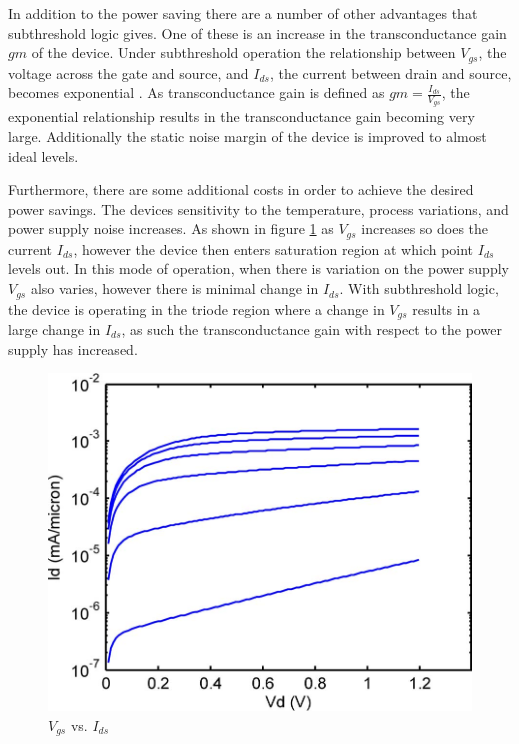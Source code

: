In addition to the power saving there are a number of other advantages that subthreshold logic gives.
One of these is an increase in the transconductance gain $gm$ of the device.
Under subthreshold operation the relationship between $V_{gs}$, the voltage across the gate and source, and $I_{ds}$, the current between drain and source, becomes exponential \cite{ULPSubThresh}.
As transconductance gain is defined as $gm = \frac{I_{ds}}{V_{gs}}$, the exponential relationship results in the transconductance gain becoming very large.
Additionally the static noise margin of the device is improved to almost ideal levels.

Furthermore, there are some additional costs in order to achieve the desired power savings.
The devices sensitivity to the temperature, process variations, and power supply noise increases.
As shown in figure \ref{fig:VgsIds} as $V_{gs}$ increases so does the current $I_{ds}$, however the device then enters saturation region at which point $I_{ds}$ levels out.
In this mode of operation, when there is variation on the power supply $V_{gs}$ also varies, however there is minimal change in $I_{ds}$.
With subthreshold logic, the device is operating in the triode region where a change in $V_{gs}$ results in a large change in $I_{ds}$, as such the transconductance gain with respect to the power supply has increased.

\begin{figure}
	\centering
	\includegraphics[width=\columnwidth]{../../images/vgsvsids.png}
	\caption{$V_{gs}$ vs. $I_{ds}$ \cite{SemiEmpiricalModels}}
	\label{fig:VgsIds}
\end{figure}

